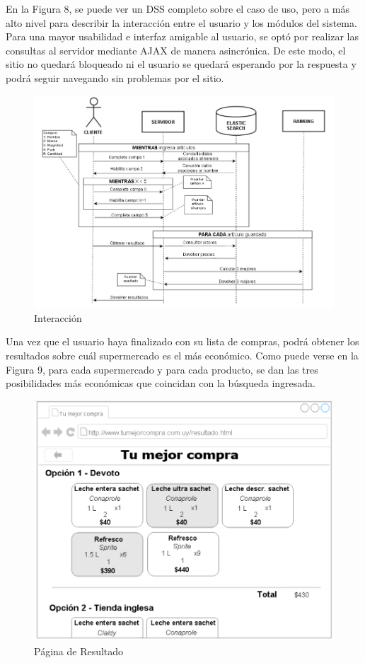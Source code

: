 \documentclass[12pt]{article} %
\begin{document}
En la Figura 8, se puede ver un DSS completo sobre el caso de uso, pero a más alto nivel para describir la interacción entre el usuario y los módulos del sistema. Para una mayor usabilidad e interfaz amigable al usuario, se optó por realizar las consultas al servidor mediante AJAX de manera asincrónica. De este modo, el sitio no quedará bloqueado ni el usuario se quedará esperando por la respuesta y podrá seguir navegando sin problemas por el sitio.

\begin{figure}[H]
\includegraphics[scale=.9]{DSS}
\centering
\caption{Interacción}
\end{figure}

Una vez que el usuario haya finalizado con su lista de compras, podrá obtener los resultados sobre cuál supermercado es el más económico. Como puede verse en la Figura 9, para cada supermercado y para cada producto, se dan las tres posibilidades más económicas que coincidan con la búsqueda ingresada.

\begin{figure}[H]
\includegraphics[scale=.9]{pag_resultado}
\centering
\caption{Página de Resultado}
\end{figure}
\end{document}
